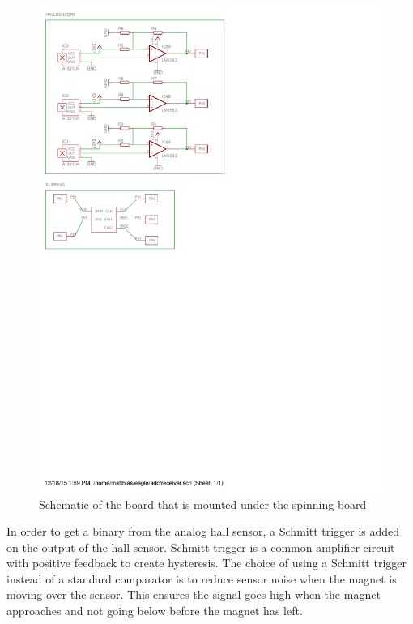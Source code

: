 \begin{figure}
 \centering
 \includegraphics[scale = 0.5,trim = 0 14.5cm 8cm 0,clip = true]{img/bottompcb_schematic}
 \caption{Schematic of the board that is mounted under the spinning board}
 \label{fig:botm_schematic}
\end{figure}

In order to get a binary from the analog hall sensor, a Schmitt trigger\cite[p. 655]{book:prac_ele} is added on the output of the hall sensor.
Schmitt trigger is a common amplifier circuit with positive feedback to create hysteresis.
The choice of using a Schmitt trigger instead of a standard comparator is to reduce sensor noise when the magnet is moving over the sensor.
This ensures the signal goes high when the magnet approaches and not going below before the magnet has left.


